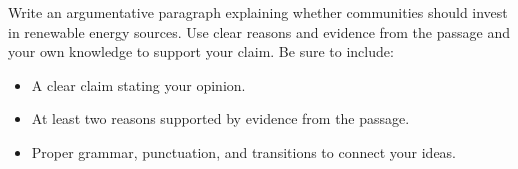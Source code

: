 \documentclass[12pt]{article}
\begin{document}
\begin{tcolorbox}[colframe=black!50, colback=white, title=Question 10: Writing Performance Task]
Write an argumentative paragraph explaining whether communities should invest in renewable energy sources. Use clear reasons and evidence from the passage and your own knowledge to support your claim. Be sure to include:  
\begin{itemize}
    \item A clear claim stating your opinion.  
    \item At least two reasons supported by evidence from the passage.  
    \item Proper grammar, punctuation, and transitions to connect your ideas.  
\end{itemize}

\vspace{2em}
 \underline{\hspace{15.8cm}}  
    \\[0.8cm] \underline{\hspace{15.8cm}}  
    \\[0.8cm] \underline{\hspace{15.8cm}}  
    \\[0.8cm] \underline{\hspace{15.8cm}}  
    \\[0.8cm] \underline{\hspace{15.8cm}}  
    \\[0.8cm] \underline{\hspace{15.8cm}}  
        \\[0.8cm] \underline{\hspace{15.8cm}}  
    \\[0.8cm] \underline{\hspace{15.8cm}}  
    \\[0.8cm] \underline{\hspace{15.8cm}}  
\end{tcolorbox}
\end{document}
